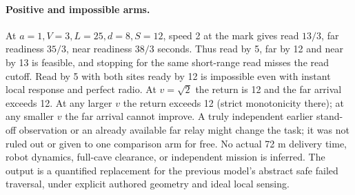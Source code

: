 \documentclass{article}
\begin{document}
\paragraph{Positive and impossible arms.}
At \(a=1,V=3,L=25,d=8,S=12\), speed 2 at the mark gives
read \(13/3\), far readiness \(35/3\), near readiness \(38/3\)
seconds. Thus read by 5, far by 12 and near by 13 is
feasible, and stopping for the same short-range read misses
the read cutoff. Read by 5 with both sites ready by 12 is
impossible even with instant local response and perfect radio.
At \(v=\sqrt2\) the return is 12 and the far
arrival exceeds 12. At any larger \(v\) the return exceeds 12
(strict monotonicity there); at any smaller \(v\) the far
arrival cannot improve. A truly independent earlier
stand-off observation or an already available far relay might
change the task; it was not ruled out or given to one
comparison arm for free. No actual 72 m delivery time,
robot dynamics, full-cave clearance, or independent mission
is inferred. The output is a quantified replacement for the
previous model's abstract safe failed traversal, under explicit
authored geometry and ideal local sensing.
\end{document}
